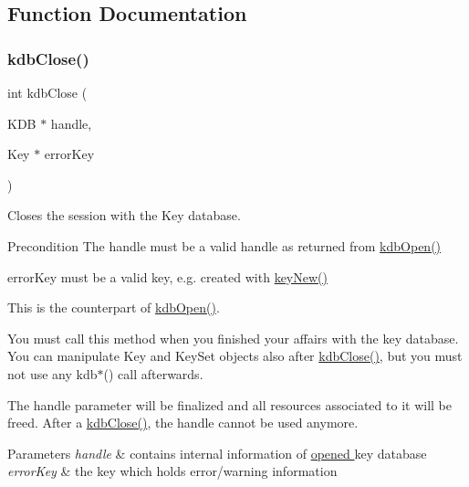 \subsection{Function Documentation}
\mbox{\label{group__kdb_gadb54dc9fda17ee07deb9444df745c96f}} 
\subsubsection{\texorpdfstring{kdb\+Close()}{kdbClose()}}
{\footnotesize\ttfamily int kdb\+Close (\begin{DoxyParamCaption}\item[{K\+DB $\ast$}]{handle,  }\item[{Key $\ast$}]{error\+Key }\end{DoxyParamCaption})}



Closes the session with the Key database. 

\begin{DoxyPrecond}{Precondition}
The handle must be a valid handle as returned from \hyperlink{group__kdb_ga6808defe5870f328dd17910aacbdc6ca}{kdb\+Open()}

error\+Key must be a valid key, e.\+g. created with \hyperlink{group__key_gad23c65b44bf48d773759e1f9a4d43b89}{key\+New()}
\end{DoxyPrecond}
This is the counterpart of \hyperlink{group__kdb_ga6808defe5870f328dd17910aacbdc6ca}{kdb\+Open()}.

You must call this method when you finished your affairs with the key database. You can manipulate Key and Key\+Set objects also after \hyperlink{group__kdb_gadb54dc9fda17ee07deb9444df745c96f}{kdb\+Close()}, but you must not use any kdb$\ast$() call afterwards.

The {\ttfamily handle} parameter will be finalized and all resources associated to it will be freed. After a \hyperlink{group__kdb_gadb54dc9fda17ee07deb9444df745c96f}{kdb\+Close()}, the {\ttfamily handle} cannot be used anymore.


\begin{DoxyParams}{Parameters}
{\em handle} & contains internal information of \hyperlink{group__kdb_ga6808defe5870f328dd17910aacbdc6ca}{opened } key database \\
\hline
{\em error\+Key} & the key which holds error/warning information \\
\hline
\end{DoxyParams}

